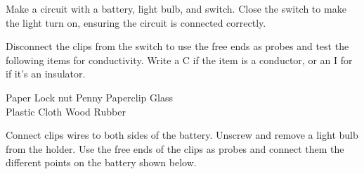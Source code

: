 \documentclass[]{exam}
\begin{document}
\begin{questions}
\question \label{Q1}
Make a circuit with a battery, light bulb, and switch. Close the switch to make the light turn on, ensuring the circuit is connected correctly. 

\question
Disconnect the clips from the switch to use the free ends as probes and test the following items for conductivity. Write a C if the item is a conductor, or an I for if it's an insulator.

\begin{center}
    Paper \fillin[I][2em] \hspace{2em}
    Lock nut \fillin[C][2em] \hspace{2em}
    Penny \fillin[C][2em] \hspace{2em}
    Paperclip \fillin[C][2em] \hspace{2em}
    Glass \fillin[I][2em] \hspace{2em} \\[1ex]
    Plastic \fillin[I][2em] \hspace{2em}
    Cloth \fillin[I][2em] \hspace{2em}
    Wood \fillin[I][2em] \hspace{2em}
    Rubber \fillin[I][2em] \hspace{2em}
\end{center}


\question
Connect clips wires to both sides of the battery. Unscrew and remove a light bulb from the holder. Use the free ends of the clips as probes and connect them the different points on the battery shown below.


\end{questions}
\end{document}
